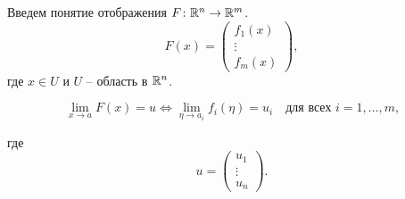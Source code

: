 	\begin{mdef}
		Введем понятие отображения $F \colon \mathbb{R}^n \to \mathbb{R}^m$.
		$$
			F(x) = 	\begin{pmatrix}
				f_1(x) \\
				\vdots \\
				f_m(x)
			\end{pmatrix},
		$$ где $x \in U$ и $U$ -- область в $\mathbb{R}^n$.
	\end{mdef}
	\begin{corollary}
		$$\lim \limits_{x\to a} F(x) = u \Leftrightarrow \lim\limits_{\eta \to a_i} f_i(\eta) = u_i \quad \text{для всех $i=1,\ldots, m$,} $$
	\end{corollary}
	где 
	$$
		u = \begin{pmatrix}
			u_1\\
			\vdots\\
			u_n
		\end{pmatrix}.
	$$